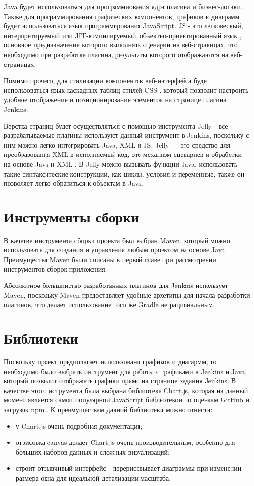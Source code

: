 Java будет использоваться для программиования ядра плагина и бизнес-логики. Также для программирования графических компонентов, графиков и диаграмм будет использоваться язык программирования JavaScript. JS - это легковесный, интерпретируемый или JIT-компилируемый, объектно-ориентированный язык \cite{js}, основное предназначение которого выполнять сценарии на веб-страницах, что необходимо при разработке плагина, результаты которого отображаются на веб-страницах.

Помимо прочего, для стилизации компонентов веб-интерфейса будет использоваться язык каскадных таблиц стилей CSS \cite{css}, который позволит настроить удобное отображение и позиционирование элементов на странице плагина Jenkins. 

Верстка страниц будет осуществляться с помощью инструмента Jelly - все разрабатываемые плагины используют данный инструмент в Jenkins, поскольку с ним можно легко интегрировать Java, XML и JS. Jelly — это средство для преобразования XML в исполняемый код, это механизм сценариев и обработки на основе Java и XML \cite{jelly}. В Jelly можно вызывать функции Java, использовать такие синтакситеские конструкции, как циклы, условия и переменные, также он позволяет легко обратиться к объектам в Java.

\section{Инструменты сборки} \label{ch1:sec5}

В качетве инструмента сборки проекта был выбран Maven, который можно использовать для создания и управления любым проектом на основе Java. Преимущества Maven были описаны в первой главе при рассмотрении инструментов сборок приложения.

Абсолютное большинство разработанных плагинов для Jenkins использует Maven, поскольку Maven предоставляет удобные архетипы для начала разработки плагинов, что делает использование того же Gradle не рациональным.


\section{Библиотеки} \label{ch1:sec6}

Поскольку проект предполагает использовани графиков и диагармм, то необходимо было выбрать инструмент для работы с графиками в Jenkins и Java, который позволит отображать графики прямо на странице задания Jenkins. В качестве этого иструмента была выбрана библиотека Chart.js, которая на данный момент является самой популярной JavaScript библеотекой по оценкам GitHub и загрузок npm \cite{chartjs}. К преимуществам данной библиотеки можно отнести: 
\begin{itemize}
	\item у Chart.js очень подробная документация;
	\item отрисовка canvas делает Chart.js очень производительным, особенно для больших наборов данных и сложных визуализаций;
	\item строит отзывчивый интерфейс - перерисовывает диаграммы при изменении размера окна для идеальной детализации масштаба.
\end{itemize}


